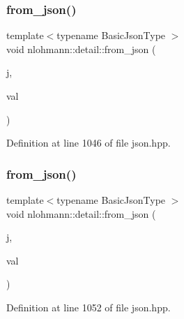 \subsubsection{\texorpdfstring{from\+\_\+json()}{from\_json()}\hspace{0.1cm}{\footnotesize\ttfamily [6/18]}}
{\footnotesize\ttfamily template$<$typename Basic\+Json\+Type $>$ \\
void nlohmann\+::detail\+::from\+\_\+json (\begin{DoxyParamCaption}\item[{const Basic\+Json\+Type \&}]{j,  }\item[{typename Basic\+Json\+Type\+::number\+\_\+unsigned\+\_\+t \&}]{val }\end{DoxyParamCaption})}



Definition at line 1046 of file json.\+hpp.

\mbox{\label{namespacenlohmann_1_1detail_a047d881e611fcac709dc318f730a1732}} 
\subsubsection{\texorpdfstring{from\+\_\+json()}{from\_json()}\hspace{0.1cm}{\footnotesize\ttfamily [7/18]}}
{\footnotesize\ttfamily template$<$typename Basic\+Json\+Type $>$ \\
void nlohmann\+::detail\+::from\+\_\+json (\begin{DoxyParamCaption}\item[{const Basic\+Json\+Type \&}]{j,  }\item[{typename Basic\+Json\+Type\+::number\+\_\+integer\+\_\+t \&}]{val }\end{DoxyParamCaption})}



Definition at line 1052 of file json.\+hpp.

\mbox{\label{namespacenlohmann_1_1detail_a5440d650150d01e8015133521351b459}} 
